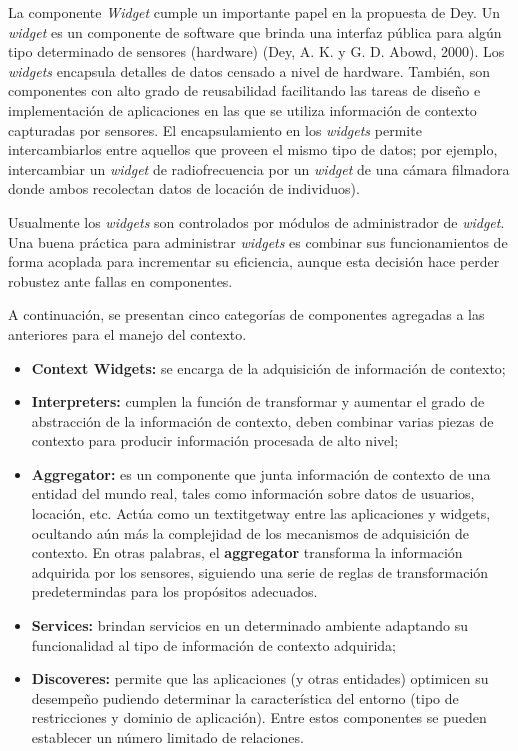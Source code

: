 La componente \textit{Widget} cumple un importante papel en la propuesta de Dey. Un \textit{widget} es un componente de software que brinda una interfaz pública para algún tipo determinado de sensores (hardware) (Dey, A. K. y G. D. Abowd, 2000). Los \textit{widgets} encapsula detalles de datos censado a nivel de hardware. También, son componentes con alto grado de reusabilidad facilitando las tareas de diseño e implementación de aplicaciones en las que se utiliza información de contexto capturadas por sensores. El encapsulamiento en los \textit{widgets} permite intercambiarlos entre aquellos que proveen el mismo tipo de datos; por ejemplo, intercambiar un \textit{widget} de radiofrecuencia por un \textit{widget} de una cámara filmadora donde ambos recolectan datos de locación de individuos).

Usualmente los \textit{widgets} son controlados por módulos de administrador de \textit{widget}. Una buena práctica para administrar \textit{widgets} es combinar sus funcionamientos de forma acoplada para incrementar su eficiencia, aunque esta decisión hace perder robustez ante fallas en componentes.

A continuación, se presentan cinco categorías de componentes agregadas a las anteriores para el manejo del contexto.


\begin{itemize}


 \item \textbf{Context Widgets:} se encarga de la adquisición de información de contexto; 

\item \textbf{Interpreters:} cumplen la función de transformar y aumentar el grado de abstracción de la información de contexto, deben combinar varias piezas de contexto para producir información procesada de alto nivel;


\item \textbf{Aggregator:} es un componente que junta información de contexto de una entidad del mundo real, tales como información sobre datos de usuarios, locación, etc. Actúa como un textit{getway} entre las aplicaciones y  widgets, ocultando aún más la complejidad de los mecanismos de adquisición de contexto. En otras palabras, el \textbf{aggregator} transforma la información adquirida por los sensores, siguiendo una serie de reglas de transformación predetermindas para los propósitos adecuados.


\item \textbf{Services:} brindan servicios en un determinado ambiente
adaptando su funcionalidad al tipo de información de contexto adquirida; 

\item \textbf{Discoveres:} permite que las aplicaciones (y otras entidades)
optimicen su desempeño pudiendo determinar la característica del entorno
(tipo de restricciones y dominio de aplicación). Entre estos componentes
se pueden establecer un número limitado de relaciones.

\end{itemize}

